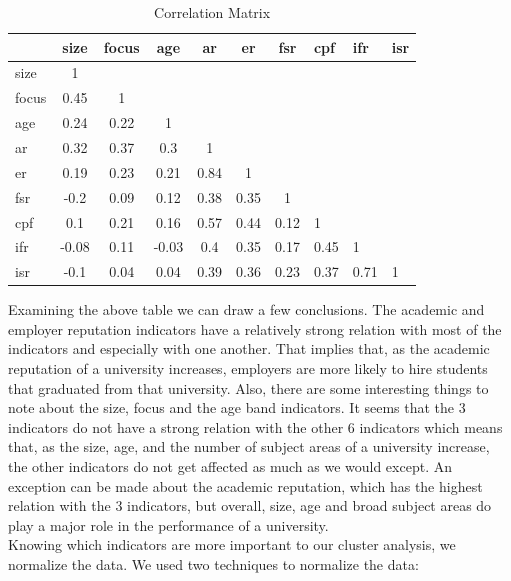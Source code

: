 \documentclass[conference]{IEEEtran}
\begin{document}
\begin{table}[ht]
    \begin{center}
        \caption{Correlation Matrix}
        \renewcommand{\arraystretch}{1.5}
        \begin{tabular}{|p{0.5cm}|c|c|c|c|c|c|p{0.4cm}|p{0.4cm}|p{0.2cm}|} 
            \hline
            & size & focus & age & ar & er & fsr & cpf &   ifr & isr \\
            \hline
            size        & 1 &  &  &  &  &  &  &  &  \\
            \hline
            focus       & 0.45 & 1 &  &  &  &  &  &  & \\
            \hline
            age    & 0.24 & 0.22 & 1 &  &  &  &  &  & \\
            \hline
            ar    & 0.32 & 0.37 & 0.3 & 1 &  &  &  &  & \\
            \hline
            er    & 0.19 & 0.23 & 0.21 & 0.84 & 1 &  &  &  & \\
            \hline
            fsr   & -0.2 & 0.09 & 0.12 & 0.38 & 0.35 & 1 &  &  & \\
            \hline
            cpf   & 0.1 & 0.21 & 0.16 & 0.57 & 0.44 & 0.12 & 1 &  & \\
            \hline
            ifr   & -0.08 & 0.11 & -0.03 & 0.4 & 0.35 & 0.17 & 0.45 & 1 & \\
            \hline
            isr   & -0.1 & 0.04 & 0.04 & 0.39 & 0.36 & 0.23 & 0.37 & 0.71 & 1 \\
            \hline
        \end{tabular}
    \end{center}
\end{table}

Examining the above table we can draw a few conclusions. The academic and employer reputation indicators have a relatively strong relation with most of the indicators and especially with one another. That implies that, as the academic reputation of a university increases, employers are more likely to hire students that graduated from that university. Also, there are some interesting things to note about the size, focus and the age band indicators. It seems that the 3 indicators do not have a strong relation with the other 6 indicators which means that, as the size, age, and the number of subject areas of a university increase, the other indicators do not get affected as much as we would except. An exception can be made about the academic reputation, which has the highest relation with the 3 indicators, but overall, size, age and broad subject areas do play a major role in the performance of a university. \\
Knowing which indicators are more important to our cluster analysis, we normalize the data. We used two techniques to normalize the data: \\
\end{document}
